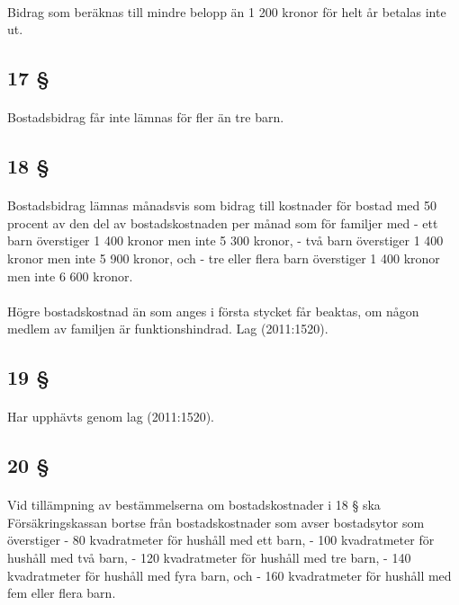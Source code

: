 \documentclass[a4paper,notitlepage,openany,10pt]{book}
\begin{document}
\paragraph*{}
Bidrag som beräknas till mindre belopp än 1 200 kronor för helt år betalas inte ut.
\subsection*{17 §}
\paragraph*{}
Bostadsbidrag får inte lämnas för fler än tre barn.
\subsection*{18 §}
\paragraph*{}
Bostadsbidrag lämnas månadsvis som bidrag till kostnader för bostad med 50 procent av den del av bostadskostnaden per månad som för familjer med
\newline - ett barn överstiger 1 400 kronor men inte 5 300 kronor,
\newline - två barn överstiger 1 400 kronor men inte 5 900 kronor, och
\newline - tre eller flera barn överstiger 1 400 kronor men inte 6 600 kronor.
\paragraph*{}
Högre bostadskostnad än som anges i första stycket får beaktas, om någon medlem av familjen är funktionshindrad.
Lag (2011:1520).
\subsection*{19 §}
\paragraph*{}
Har upphävts genom
lag (2011:1520).
\subsection*{20 §}
\paragraph*{}
Vid tillämpning av bestämmelserna om bostadskostnader i 18 § ska Försäkringskassan bortse från bostadskostnader som avser bostadsytor som överstiger - 80 kvadratmeter för hushåll med ett barn,
\newline - 100 kvadratmeter för hushåll med två barn,
\newline - 120 kvadratmeter för hushåll med tre barn,
\newline - 140 kvadratmeter för hushåll med fyra barn, och
\newline - 160 kvadratmeter för hushåll med fem eller flera barn.
\end{document}
